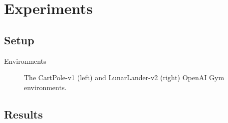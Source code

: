 \section{Experiments}

\subsection{Setup}

\begin{frame}{Environments}
    \begin{figure}
        \centering
        \begin{subfigure}{0.48\textwidth}
            \raggedleft
        \end{subfigure}
        \begin{subfigure}{0.48\textwidth}
            \raggedright
        \end{subfigure}
        \caption{The CartPole-v1 (left) and LunarLander-v2 (right) OpenAI Gym environments. \cite{gym}}
        \label{fig:environments}
    \end{figure}
\end{frame}

\subsection{Results}

